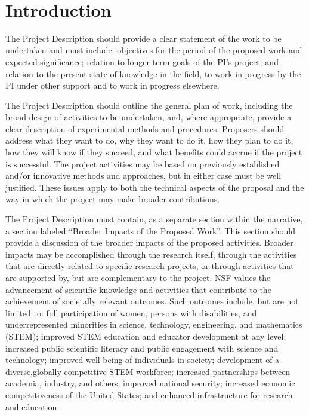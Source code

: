 \documentclass{proposalnsf}
\renewcommand{\title}{\noindent {\Large{\bf Here Goes Your Title!}}}
\begin{document}
\renewcommand{\thepage} {D--\arabic{page}}

\newpage

\title\\

\section{Introduction}

The Project Description should provide a clear statement of the work to be undertaken and must include:
objectives for the period of the proposed work and expected significance; relation to longer-term goals of the PI's
project; and relation to the present state of knowledge in the field, to work in progress by the PI under other
support and to work in progress elsewhere.

The Project Description should outline the general plan of work, including the broad design of activities to be
undertaken, and, where appropriate, provide a clear description of experimental methods and procedures.
Proposers should address what they want to do, why they want to do it, how they plan to do it, how they will
know if they succeed, and what benefits could accrue if the project is successful. The project activities may be
based on previously established and/or innovative methods and approaches, but in either case must be well
justified. These issues apply to both the technical aspects of the proposal and the way in which the project may
make broader contributions.

The Project Description must contain, as a separate section within the narrative, a section labeled ``Broader
Impacts of the Proposed Work''. This section should provide a discussion of the broader impacts of the proposed
activities. Broader impacts may be accomplished through the research itself, through the activities that are
directly related to specific research projects, or through activities that are supported by, but are complementary to 
the project. NSF values the advancement of scientific knowledge and activities that contribute to the
achievement of societally relevant outcomes. Such outcomes include, but are not limited to: full
participation of women, persons with disabilities, and underrepresented minorities in science, technology, engineering, and
mathematics (STEM); improved STEM education and educator development at any level; increased public
scientific literacy and public engagement with science and technology; improved well-being of individuals in
society; development of a diverse,globally competitive STEM workforce; increased partnerships between
academia, industry, and others; improved national security; increased economic competitiveness of the United
States; and enhanced infrastructure for research and education.
\end{document}
